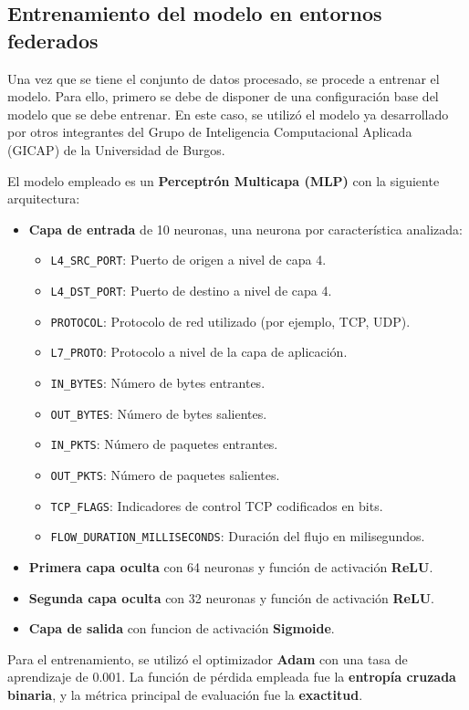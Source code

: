 \subsection{Entrenamiento del modelo en entornos federados}
\label{subsec:EntrenamientoModelo}
Una vez que se tiene el conjunto de datos procesado, se procede a entrenar el modelo. Para ello, primero se debe de disponer de una configuración base del modelo que se debe entrenar. En este caso, se utilizó el modelo ya desarrollado por otros integrantes del Grupo de Inteligencia Computacional Aplicada (GICAP) de la Universidad de Burgos.

El modelo empleado es un \textbf{Perceptrón Multicapa (MLP)} con la siguiente arquitectura:
\begin{itemize}
    \item \textbf{Capa de entrada} de 10 neuronas, una neurona por característica analizada:
    \begin{itemize}
        \item \texttt{L4\_SRC\_PORT}: Puerto de origen a nivel de capa 4.
        \item \texttt{L4\_DST\_PORT}: Puerto de destino a nivel de capa 4.
        \item \texttt{PROTOCOL}: Protocolo de red utilizado (por ejemplo, TCP, UDP).
        \item \texttt{L7\_PROTO}: Protocolo a nivel de la capa de aplicación.
        \item \texttt{IN\_BYTES}: Número de bytes entrantes.
        \item \texttt{OUT\_BYTES}: Número de bytes salientes.
        \item \texttt{IN\_PKTS}: Número de paquetes entrantes.
        \item \texttt{OUT\_PKTS}: Número de paquetes salientes.
        \item \texttt{TCP\_FLAGS}: Indicadores de control TCP codificados en bits.
        \item \texttt{FLOW\_DURATION\_MILLISECONDS}: Duración del flujo en milisegundos.
    \end{itemize}
    \item \textbf{Primera capa oculta} con 64 neuronas y función de activación \textbf{ReLU}.
    \item \textbf{Segunda capa oculta} con 32 neuronas y función de activación \textbf{ReLU}.
    \item \textbf{Capa de salida} con funcion de activación \textbf{Sigmoide}.
\end{itemize}
Para el entrenamiento, se utilizó el optimizador \textbf{Adam} con una tasa de aprendizaje de 0.001. La función de pérdida empleada fue la \textbf{entropía cruzada binaria}, y la métrica principal de evaluación fue la \textbf{exactitud}.

